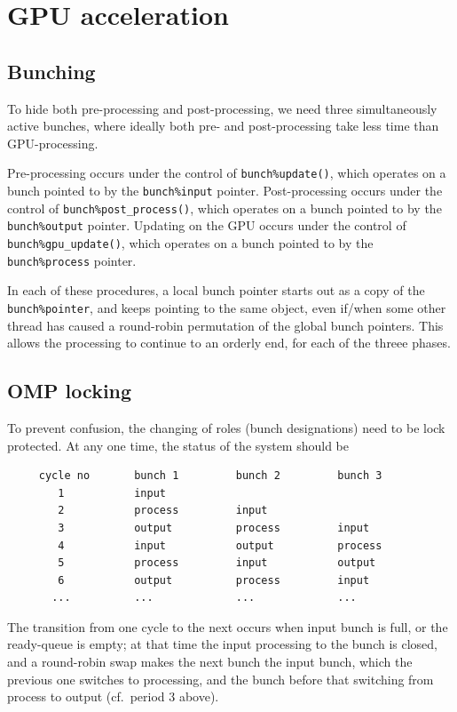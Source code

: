 \documentclass[paper=a4,fontsize=11pt]{scrartcl}
\numberwithin{equation}{section}		%
\numberwithin{figure}{section}			%
\numberwithin{table}{section}				%
\newcommand{\codecolor}{\color{Blue}}
\begin{document}
\section{GPU acceleration}

\subsection{Bunching}
To hide both pre-processing and post-processing, we need three simultaneously active bunches, where ideally both pre- and post-processing take less time than GPU-processing.

Pre-processing occurs under the control of \verb|bunch%update()|, which operates on a bunch pointed to by the \verb|bunch%input| pointer. 
Post-processing occurs under the control of \verb|bunch%post_process()|, which operates on a bunch pointed to by the \verb|bunch%output| pointer.
Updating on the GPU occurs under the control of \verb|bunch%gpu_update()|, which operates on a bunch pointed to by the \verb|bunch%process| pointer.

In each of these procedures, a local bunch pointer starts out as a copy of the \verb|bunch%pointer|, and keeps pointing to the same object, even if/when some other thread has caused a round-robin permutation of the global bunch pointers.  This allows the processing to continue to an orderly end, for each of the threee phases.

\subsection{OMP locking}
To prevent confusion, the changing of roles (bunch designations) need to be lock protected. 
At any one time, the status of the system should be
{\small\codecolor\begin{verbatim}
     cycle no       bunch 1         bunch 2         bunch 3
        1           input
        2           process         input
        3           output          process         input
        4           input           output          process
        5           process         input           output
        6           output          process         input
       ...          ...             ...             ...
\end{verbatim}}
The transition from one cycle to the next occurs when input bunch is full, or the ready-queue is empty; at that time the input processing to the bunch is closed, and a round-robin swap makes the next bunch the input bunch, which the previous one switches to processing, and the bunch before that switching from process to output (cf.\ period 3 above).
\end{document}
